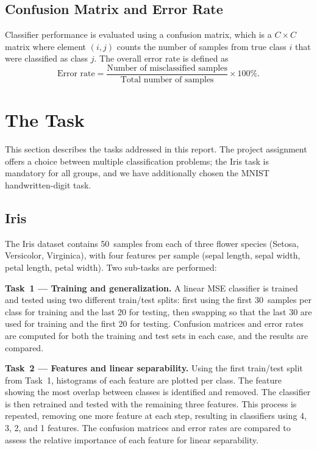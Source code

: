 \documentclass[11pt,a4paper]{article}
\begin{document}
\subsection{Confusion Matrix and Error Rate}

Classifier performance is evaluated using a confusion matrix, which is a $C \times C$ matrix where element $(i,j)$ counts the number of samples from true class $i$ that were classified as class $j$. The overall error rate is defined as
\begin{equation}
    \text{Error rate} = \frac{\text{Number of misclassified samples}}{\text{Total number of samples}} \times 100\%.
    \label{eq:errorrate}
\end{equation}

\section{The Task}
\label{sec:task}

This section describes the tasks addressed in this report. The project assignment offers a choice between multiple classification problems; the Iris task is mandatory for all groups, and we have additionally chosen the MNIST handwritten-digit task.

\subsection*{Iris}
The Iris dataset contains 50~samples from each of three flower species (Setosa, Versicolor, Virginica), with four features per sample (sepal length, sepal width, petal length, petal width). Two sub-tasks are performed:

\textbf{Task~1 --- Training and generalization.} A linear MSE classifier is trained and tested using two different train/test splits: first using the first 30~samples per class for training and the last 20 for testing, then swapping so that the last 30 are used for training and the first 20 for testing. Confusion matrices and error rates are computed for both the training and test sets in each case, and the results are compared.

\textbf{Task~2 --- Features and linear separability.} Using the first train/test split from Task~1, histograms of each feature are plotted per class. The feature showing the most overlap between classes is identified and removed. The classifier is then retrained and tested with the remaining three features. This process is repeated, removing one more feature at each step, resulting in classifiers using 4, 3, 2, and 1 features. The confusion matrices and error rates are compared to assess the relative importance of each feature for linear separability.
\end{document}
